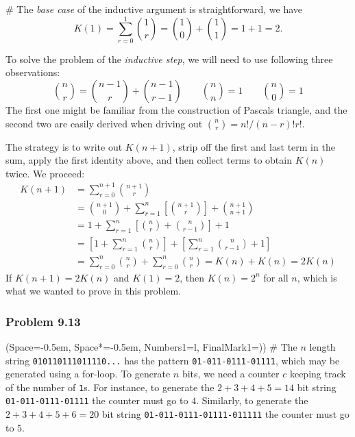 \documentclass[12pt, a4paper]{article}
\newcommand{\listSpace}{-0.5em}%
\begin{document}
{\begin{easylist}[enumerate]
# The \emph{base case} of the inductive argument is straightforward, we have
\begin{equation*}
	K(1) = \sum_{r=0}^{1} \binom{1}{r} = \binom{1}{0} + \binom{1}{1} = 1 + 1 = 2.
\end{equation*}

To solve the problem of the \emph{inductive step}, we will need to use following three observations:
\begin{equation*}
	\binom{n}{r} = \binom{n-1}{r} + \binom{n-1}{r-1}
	\qquad 
	\binom{n}{n} = 1
	\qquad 
	\binom{n}{0} = 1
\end{equation*}
The first one might be familiar from the construction of Pascals triangle, and the second two are easily derived when driving out $\binom{n}{r} = n! / (n-r)! r!$.

The strategy is to write out $K(n+1)$, strip off the first and last term in the sum, apply the first identity above, and then collect terms to obtain $K(n)$ twice.
We proceed:
\begin{align*}
	K(n+1) &= \sum_{r=0}^{n+1} \binom{n+1}{r} \\
	&= \binom{n+1}{0} + \sum_{r=1}^{n} \left[\binom{n+1}{r}\right] + \binom{n+1}{n+1} \\
	&= 1 + \sum_{r=1}^{n} \left[\binom{n}{r} + \binom{n}{r-1}\right] + 1 \\
	&= \left[1 + \sum_{r=1}^{n} \binom{n}{r}\right] +\left[ \sum_{r=1}^{n} \binom{n}{r-1} + 1\right] \\
	&= \sum_{r=0}^{n} \binom{n}{r} + \sum_{r=0}^{n} \binom{n}{r} =
	K(n) + K(n) = 2K(n)
\end{align*}
If $K(n+1) = 2K(n)$ and $K(1) = 2$, then $K(n) = 2^n$ for all $n$, which is what we wanted to prove in this problem.
\end{easylist}



\subsubsection*{Problem 9.13}
\begin{easylist}[enumerate]
\ListProperties(Space=\listSpace, Space*=\listSpace, Numbers1=l, FinalMark1={)})
# The $n$ length string \texttt{010110111011110...} has the pattern \texttt{01-011-0111-01111}, which may be generated using a for-loop.
To generate $n$ bits, we need a counter $c$ keeping track of the number of \texttt{1}s. 
For instance, to generate the $2 + 3 + 4 + 5 = 14$ bit string \texttt{01-011-0111-01111} the counter must go to $4$.
Similarly, to generate the $2 + 3 + 4 + 5  + 6= 20$ bit string \texttt{01-011-0111-01111-011111} the counter must go to $5$.


\end{easylist}}
\end{document}
